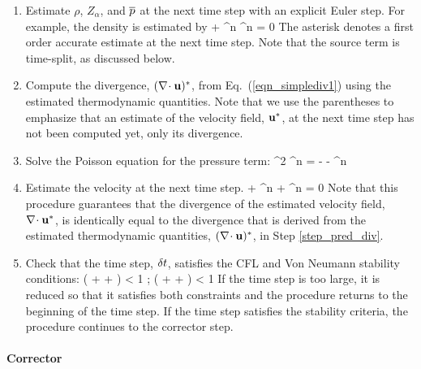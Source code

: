 \begin{enumerate}
\item Estimate $\rho$, $Z_\alpha$, and $\overline{p}$ at the next time step with an explicit Euler step. For
example, the density is estimated by
\be {} + \nabla\!\cdot \rho^n \bu^n = 0 \ee
The asterisk denotes a first order accurate estimate at the next time step.  Note that the source term is time-split, as discussed below.

\item \label{step_pred_div} Compute the divergence, $(\nabla\!\cdot {\bf u})^*$, from Eq.~(\ref{eqn_simplediv1}) using the estimated thermodynamic quantities. Note that we use the parentheses to emphasize that an estimate of the velocity field, ${\bf u}^*$, at the next time step has not been computed yet, only its divergence.

\item Solve the Poisson equation for the pressure term:
\be \nabla^2 \cH^n = -  - \nabla\!\cdot \bF^n  \ee

\item Estimate the velocity at the next time step.
\be
{} +  \bF^n + ^n = 0
\ee
Note that this procedure guarantees that the divergence of the estimated velocity field, $\nabla\!\cdot {\bf u}^*$, is identically
equal to the divergence that is derived from the estimated thermodynamic quantities, $(\nabla\!\cdot {\bf u})^*$, in Step \ref{step_pred_div}.

\item Check that the time step, $\delta t$, satisfies the CFL and Von Neumann stability conditions:
\be \dt \; \left(  +  +  \right) < 1 \quad ;  \; \dt \; \frac{\mu}{\rho} \; \left( +  +  \right) < 1 \ee
If the time step is too large, it is reduced so that it satisfies
both constraints and the procedure returns to the beginning of the time step.
If the time step satisfies the stability criteria, the procedure continues to the corrector step.
\end{enumerate}

\paragraph{Corrector}

